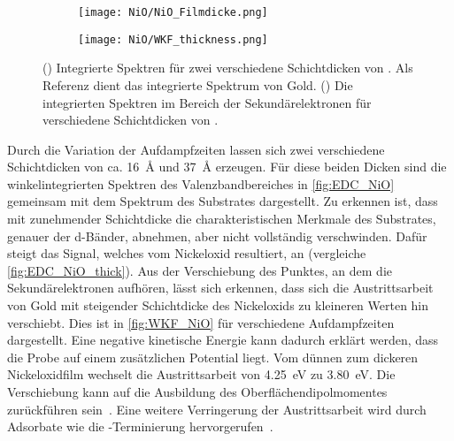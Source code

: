         \begin{figure}
            \centering
            \begin{subfigure}[t]{0.48\textwidth}
                \centering
                \texttt{[image: NiO/NiO\_Filmdicke.png]}
                \subcaption{}
                \label{fig:EDC_NiO}
            \end{subfigure}
            \begin{subfigure}[t]{0.48\textwidth}
                \centering
                \texttt{[image: NiO/WKF\_thickness.png]}
                \caption{}
                \label{fig:WKF_NiO}
            \end{subfigure}
            \caption{() Integrierte Spektren für zwei verschiedene Schichtdicken von . Als Referenz dient das integrierte Spektrum von Gold. 
            () Die integrierten Spektren im Bereich der Sekundärelektronen für verschiedene Schichtdicken von .}
        \end{figure}
        Durch die Variation der Aufdampfzeiten lassen sich zwei verschiedene Schichtdicken von ca. \SI{16}{\angstrom} und \SI{37}{\angstrom} erzeugen.
        Für diese beiden Dicken sind die winkelintegrierten Spektren des Valenzbandbereiches in \autoref{fig:EDC_NiO} gemeinsam mit dem Spektrum des Substrates dargestellt.
        Zu erkennen ist, dass mit zunehmender Schichtdicke die charakteristischen Merkmale des Substrates, genauer der d-Bänder, abnehmen, aber nicht vollständig verschwinden.
        Dafür steigt das Signal, welches vom Nickeloxid resultiert, an (vergleiche \autoref{fig:EDC_NiO_thick}).
        Aus der Verschiebung des Punktes, an dem die Sekundärelektronen aufhören, lässt sich erkennen, dass sich die Austrittsarbeit von Gold mit steigender Schichtdicke des Nickeloxids zu kleineren Werten hin verschiebt.
        Dies ist in \autoref{fig:WKF_NiO} für verschiedene Aufdampfzeiten dargestellt.
        Eine negative kinetische Energie kann dadurch erklärt werden, dass die Probe auf einem zusätzlichen Potential liegt.
        Vom dünnen zum dickeren Nickeloxidfilm wechselt die Austrittsarbeit von \SI{4.25}{\electronvolt} zu \SI{3.80}{\electronvolt}.
        Die Verschiebung kann auf die Ausbildung des Oberflächendipolmomentes zurückführen sein~\cite{5A_5}.
        Eine weitere Verringerung der Austrittsarbeit wird durch Adsorbate wie die -Terminierung hervorgerufen~\cite{NiO_40}.

